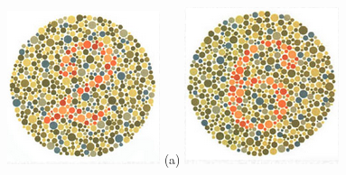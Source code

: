 \documentclass[	12pt, Times, openright, twoside, a4paper, english, brazil]{abntex2}
\begin{document}
\begin{apendicesenv}
\begin{figure}[!htb]
\centering
{\includegraphics[width=\linewidth]{ishihara-fuga/figureIshihara10.png}}
(a)
\endminipage\hfill
{}
\centering
{\includegraphics[width=\linewidth]{ishihara-fuga/figureIshihara11.png}}

\end{figure}
\end{apendicesenv}
\end{document}
